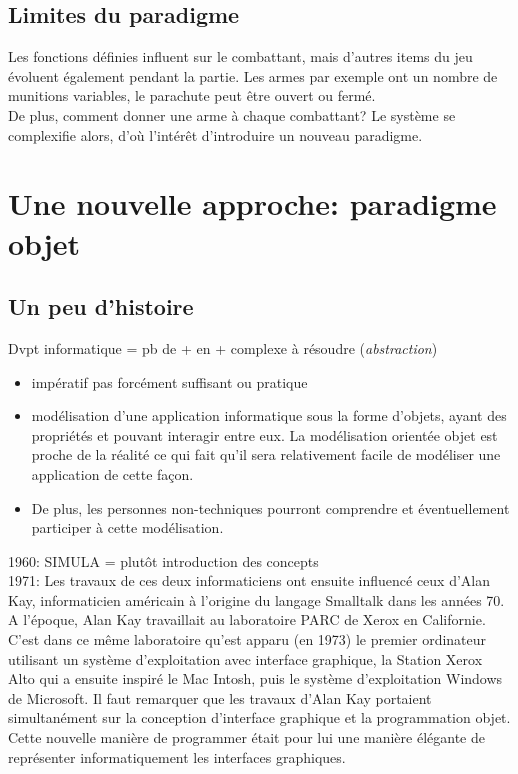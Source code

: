 \documentclass[a4paper,11pt]{article}
\begin{document}
\begin{Form}
\begin{commentprof}
\subsection*{Limites du paradigme}
Les fonctions définies influent sur le combattant, mais d'autres items du jeu évoluent également pendant la partie. Les armes par exemple ont un nombre de munitions variables, le parachute peut être ouvert ou fermé.\\De plus, comment donner une arme à chaque combattant? Le système se complexifie alors, d'où l'intérêt d'introduire un nouveau paradigme.
\end{commentprof}
\section{Une nouvelle approche: paradigme objet}
\begin{commentprof}
\subsection*{Un peu d'histoire}
Dvpt informatique = pb de + en + complexe à résoudre (\emph{abstraction})
\begin{itemize}
\item impératif pas forcément suffisant ou pratique
\item modélisation d'une application informatique sous la forme d’objets, ayant des propriétés et pouvant interagir entre eux. La modélisation orientée objet est proche de la réalité ce qui fait qu’il sera relativement facile de modéliser une application de cette façon.
\item De plus, les personnes non-techniques pourront comprendre et éventuellement participer à cette modélisation.
\end{itemize}
1960: SIMULA = plutôt introduction des concepts\\
1971: Les travaux de ces deux informaticiens ont ensuite influencé ceux d'Alan Kay, informaticien américain à l'origine du langage Smalltalk dans les années 70. A l'époque, Alan Kay travaillait au laboratoire PARC de Xerox en Californie. C'est dans ce même laboratoire qu'est apparu (en 1973) le premier ordinateur utilisant un système d'exploitation avec interface graphique, la Station Xerox Alto qui a ensuite inspiré le Mac Intosh, puis le système d'exploitation Windows de Microsoft. Il faut remarquer que les travaux d'Alan Kay portaient simultanément sur la conception d'interface graphique et la programmation objet. Cette nouvelle manière de programmer était pour lui une manière élégante de représenter informatiquement les interfaces graphiques. 
\end{commentprof}

\end{Form}
\end{document}
